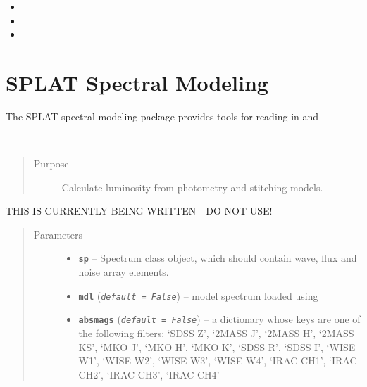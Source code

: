 \documentclass[letterpaper,10pt,english]{sphinxmanual}
\begin{document}
\begin{itemize}
\item {} 

\item {} 

\item {} 

\end{itemize}


\section{SPLAT Spectral Modeling}
\label{splat_model::doc}\label{splat_model:splat-spectral-modeling}
The SPLAT spectral modeling package provides tools for reading in and
\label{splat_model:module-splat_model}

\begin{fulllineitems}
\label{splat_model:splat_model.calcLuminosity}~\begin{quote}\begin{description}
\item[{Purpose}] \leavevmode
Calculate luminosity from photometry and stitching models.

\end{description}\end{quote}

THIS IS CURRENTLY BEING WRITTEN - DO NOT USE!
\begin{quote}\begin{description}
\item[{Parameters}] \leavevmode\begin{itemize}
\item {} 
\textbf{\texttt{sp}} -- Spectrum class object, which should contain wave, flux and
noise array elements.

\item {} 
\textbf{\texttt{mdl}} (\emph{\texttt{default = False}}) -- model spectrum loaded using 

\item {} 
\textbf{\texttt{absmags}} (\emph{\texttt{default = False}}) -- a dictionary whose keys are one of the following filters: `SDSS Z',
`2MASS J', `2MASS H', `2MASS KS', `MKO J', `MKO H', `MKO K', `SDSS R',
`SDSS I', `WISE W1', `WISE W2', `WISE W3', `WISE W4', `IRAC CH1',
`IRAC CH2', `IRAC CH3', `IRAC CH4'

\end{itemize}

\end{description}\end{quote}

\end{fulllineitems}
\end{document}
